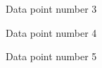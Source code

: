 \documentclass{article}
\begin{document}
\begin{figure}
\centering
{}
\caption{Data point number 3} \label{fig:q163}
\end{figure}

\begin{figure}
\centering
{}
\caption{Data point number 4} \label{fig:q164}
\end{figure}

\begin{figure}
\centering
{}
\caption{Data point number 5} \label{fig:q165}
\end{figure}
\end{document}
